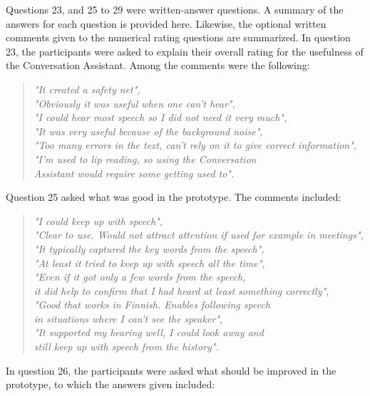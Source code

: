 \documentclass[english, 12pt, a4paper, pdftex, elec, utf8]{aaltothesis}
\renewcommand{\baselinestretch}{1.02}
\begin{document}
Questions 23, and 25 to 29 were written-answer questions. A summary of the answers for each question is provided here. Likewise, the optional written comments given to the numerical rating questions are summarized. In question 23, the participants were asked to explain their overall rating for the usefulness of the Conversation Assistant. Among the comments were the following:
\begin{quote}
	\centering
	\renewcommand{\baselinestretch}{1.4}
	\textit{
	"It created a safety net", \\
	"Obviously it was useful when one can't hear", \\
	"I could hear most speech so I did not need it very much", \\
	"It was very useful because of the background noise", \\
	"Too many errors in the text, can't rely on it to give correct information", \\
	"I'm used to lip reading, so using the Conversation \\ Assistant would require some getting used to".}
\end{quote}
\vspace{1mm}
Question 25 asked what was good in the prototype. The comments included:
\begin{quote}
	\centering
	\renewcommand{\baselinestretch}{1.4}
	\textit{
		"I could keep up with speech", \\
		"Clear to use. Would not attract attention if used for example in meetings", \\
		"It typically captured the key words from the speech", \\
		"At least it tried to keep up with speech all the time", \\
		"Even if it got only a few words from the speech, \\ \vspace{-2.5mm} it did help to confirm that I had heard at least something correctly", \\
		"Good that works in Finnish. Enables following speech \\ \vspace{-2.5mm} in situations where I can't see the speaker", \\
		"It supported my hearing well, I could look away and \\ still keep up with speech from the history".}
\end{quote}
\vspace{1mm}
In question 26, the participants were asked what should be improved in the prototype, to which the answers given included:
\end{document}
